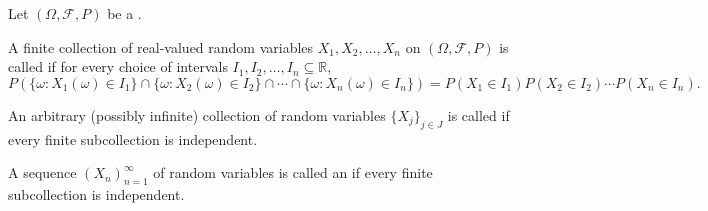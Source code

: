 \begin{definition} \label{definition:independence_of_random_variables_on_a_probability_space}
Let $(\Omega, \mathcal{F}, P)$ be a .

A finite collection of real-valued random variables $X_1, X_2, \dots, X_n$ on $(\Omega, \mathcal{F}, P)$ is called  if for every choice of intervals $I_1, I_2, \dots, I_n \subseteq \mathbb{R}$,
$$P\left(\{\omega : X_1(\omega) \in I_1\} \cap \{\omega : X_2(\omega) \in I_2\} \cap \cdots \cap \{\omega : X_n(\omega) \in I_n\}\right) = P(X_1 \in I_1) P(X_2 \in I_2) \cdots P(X_n \in I_n).$$

An arbitrary (possibly infinite) collection of random variables $\{X_j\}_{j \in J}$ is called  if every finite subcollection is independent.

A sequence $(X_n)_{n=1}^\infty$ of random variables is called an  if every finite subcollection is independent.
\end{definition}
